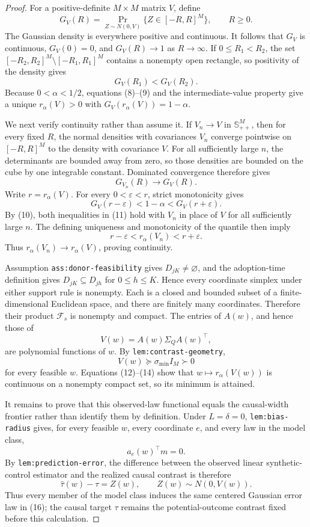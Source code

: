 \documentclass{article}
\begin{document}
\begin{proof}
For a positive-definite \(M\times M\) matrix \(V\), define
\[
 G_V(R)=\Pr_{Z\sim N(0,V)}\{Z\in[-R,R]^M\},
 \qquad R\geq0. \tag{8}
\]
The Gaussian density is everywhere positive and continuous.  It follows
that \(G_V\) is continuous, \(G_V(0)=0\), and
\(G_V(R)\to1\) as \(R\to\infty\).  If \(0\leq R_1<R_2\), the set
\([-R_2,R_2]^M\setminus[-R_1,R_1]^M\) contains a nonempty open rectangle,
so positivity of the density gives
\[
 G_V(R_1)<G_V(R_2). \tag{9}
\]
Because \(0<\alpha<1/2\), equations (8)--(9) and the intermediate-value
property give a unique \(r_\alpha(V)>0\) with
\(G_V(r_\alpha(V))=1-\alpha\).

We next verify continuity rather than assume it.  If \(V_n\to V\) in
\(\mathbb S_{++}^M\), then for every fixed \(R\), the normal densities with
covariances \(V_n\) converge pointwise on \([-R,R]^M\) to the density with
covariance \(V\).  For all sufficiently large \(n\), the determinants are
bounded away from zero, so those densities are bounded on the cube by one
integrable constant.  Dominated convergence therefore gives
\[
 G_{V_n}(R)\longrightarrow G_V(R). \tag{10}
\]
Write \(r=r_\alpha(V)\).  For every \(0<\varepsilon<r\), strict
monotonicity gives
\[
 G_V(r-\varepsilon)<1-\alpha<G_V(r+\varepsilon). \tag{11}
\]
By (10), both inequalities in (11) hold with \(V_n\) in place of \(V\) for
all sufficiently large \(n\).  The defining uniqueness and monotonicity of
the quantile then imply
\[
 r-\varepsilon<r_\alpha(V_n)<r+\varepsilon. \tag{12}
\]
Thus \(r_\alpha(V_n)\to r_\alpha(V)\), proving continuity.

Assumption \texttt{ass:donor-feasibility} gives
\(D_{jK}\ne\varnothing\), and the adoption-time definition gives
\(D_{jK}\subseteq D_{jh}\) for \(0\leq h\leq K\).  Hence every coordinate
simplex under either support rule is nonempty.  Each is a closed and bounded
subset of a finite-dimensional Euclidean space, and there are finitely many
coordinates.  Therefore their product \(\mathcal F_s\) is nonempty and
compact.  The entries of \(A(w)\), and hence those of
\[
 V(w)=A(w)\Sigma_QA(w)^{\top}, \tag{13}
\]
are polynomial functions of \(w\).  By
\texttt{lem:contrast-geometry},
\[
 V(w)\succeq\sigma_{\min}I_M\succ0 \tag{14}
\]
for every feasible \(w\).  Equations (12)--(14) show that
\(w\mapsto r_\alpha(V(w))\) is continuous on a nonempty compact set, so its
minimum is attained.

It remains to prove that this observed-law functional equals the causal-width
frontier rather than identify them by definition.  Under \(L=\delta=0\),
\texttt{lem:bias-radius} gives, for every feasible \(w\), every coordinate
\(e\), and every law in the model class,
\[
 a_e(w)^{\top}m=0. \tag{15}
\]
By \texttt{lem:prediction-error}, the difference between the observed linear
synthetic-control estimator and the realized causal contrast is therefore
\[
 \widehat\tau(w)-\tau=Z(w),
 \qquad Z(w)\sim N(0,V(w)). \tag{16}
\]
Thus every member of the model class induces the same centered Gaussian
error law in (16); the causal target \(\tau\) remains the potential-outcome
contrast fixed before this calculation.


\end{proof}
\end{document}
